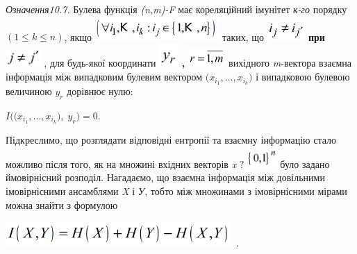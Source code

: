  \textit{Означення10.7.}\textit{ }Булева функція
\textit{(}\textit{n}\textit{,}\textit{m}\textit{)-}\textit{F}  має кореляційний
імунітет  \textit{к-го }порядку  ${(1\le k\le n)}$, якщо 
\includegraphics[width=1.8598in,height=0.3634in]{crypt-img/crypt-img209.png} 
таких, що 
\includegraphics[width=0.5689in,height=0.3272in]{crypt-img/crypt-img210.png} 
\textbf{при }
\includegraphics[width=0.528in,height=0.2701in]{crypt-img/crypt-img211.png} ,
для будь-якої  координати 
\includegraphics[width=0.2898in,height=0.348in]{crypt-img/crypt-img212.png}
\textbf{, }
\includegraphics[width=0.5583in,height=0.2736in]{crypt-img/crypt-img213.png} 
вихідного \textit{m}{}-вектора  взаємна інформація між випадковим булевим 
вектором  ${(x_{{i_{{1}}}},\dots,x_{i_{{k}}}{)}}$ і
випадковою булевою величиною  ${y_{{r}}}$ дорівнює нулю:

{\centering
 ${I((x_{{i_{{1}}}},\dots,x_{i_{{k}}}{),\;y_{r}}{)=0}}$.
\par}

Підкреслимо, що розглядати відповідні ентропії та взаємну інформацію стало
можливо після того, як на множині  вхідних векторів \textit{x} ${?}$
\includegraphics[width=0.4437in,height=0.3193in]{crypt-img/crypt-img214.png} 
було задано ймовірнісний розподіл. Нагадаємо, що взаємна інформація  між
довільними імовірнісними  ансамблями \textit{X }і \textit{У}, тобто між
множинами з імовірнісними мірами можна знайти з формулою

{\centering\itshape
 \includegraphics[width=3.402in,height=0.3744in]{crypt-img/crypt-img215.png} , 
\par}

